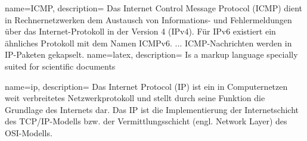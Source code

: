 \makeglossaries
{}
{
	name=ICMP,
	description={
		Das Internet Control Message Protocol (ICMP) dient in Rechnernetzwerken dem Austausch von Informations- und Fehlermeldungen über das Internet-Protokoll in der Version 4 (IPv4). Für IPv6 existiert ein ähnliches Protokoll mit dem Namen ICMPv6. ... ICMP-Nachrichten werden in IP-Paketen gekapselt.
	}
}
{
	name=latex,
	description={
		Is a markup language specially suited 
		for scientific documents}
}

{
	name=ip,
	description={
		Das Internet Protocol (IP) ist ein in Computernetzen weit verbreitetes Netzwerkprotokoll und stellt durch seine Funktion die Grundlage des Internets dar. Das IP ist die Implementierung der Internetschicht des TCP/IP-Modells bzw. der Vermittlungsschicht (engl. Network Layer) des OSI-Modells.
	}
}
